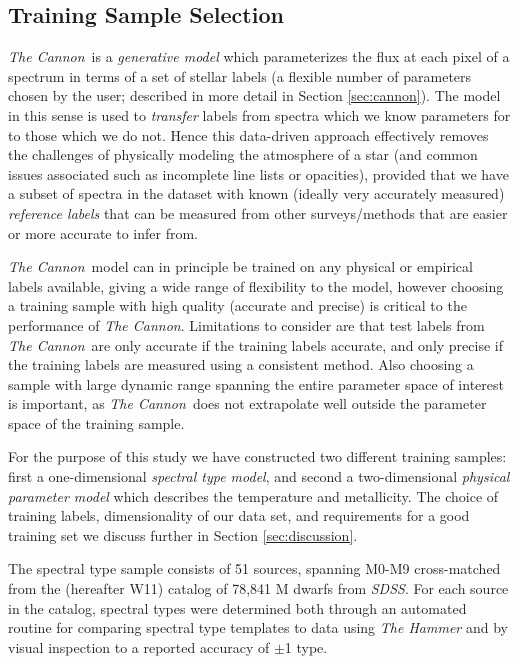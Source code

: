 \documentclass[modern]{aastex62}
\newcommand{\thecannon}{\textsl{The Cannon}}
\newcommand{\sdss}{\textsl{SDSS}}
\begin{document}
\subsection{Training Sample Selection}

\thecannon\ is a \emph{generative model} which parameterizes the flux at each pixel of a spectrum in terms of a set of stellar labels (a flexible number of parameters chosen by the user; described in more detail in Section \ref{sec:cannon}). The model in this sense is used to \emph{transfer} labels from spectra which we know parameters for to those which we do not. Hence this data-driven approach effectively removes the challenges of physically modeling the atmosphere of a star (and common issues associated such as incomplete line lists or opacities), provided that we have a subset of spectra in the dataset with known (ideally very accurately measured) \emph{reference labels} that can be measured from other surveys/methods that are easier or more accurate to infer from. 

\thecannon\ model can in principle be trained on any physical or empirical labels available, giving a wide range of flexibility to the model, however choosing a training sample with high quality (accurate and precise) is critical to the performance of \thecannon. Limitations to consider are that test labels from \thecannon\ are only accurate if the training labels accurate, and only precise if the training labels are measured using a consistent method. Also choosing a sample with large dynamic range spanning the entire parameter space of interest is important, as \thecannon\ does not extrapolate well outside the parameter space of the training sample.
\color{gcolor}{HOGG: More notes to add here?}\color{black}

For the purpose of this study we have constructed two different training samples: first a one-dimensional \emph{spectral type model}, and second a two-dimensional \emph{physical parameter model} which describes the temperature and metallicity. The choice of training labels, dimensionality of our data set, and requirements for a good training set we discuss further in Section \ref{sec:discussion}.

The spectral type sample consists of 51 sources, spanning M0-M9 cross-matched from the \citealt{West:2011} (hereafter W11) catalog of 78,841 M dwarfs from \sdss. For each source in the catalog, spectral types were determined both through an automated routine for comparing spectral type templates to data using \textsl{The Hammer} \citep{Covey:2007} and by visual inspection to a reported accuracy of $\pm$1 type.
\end{document}
